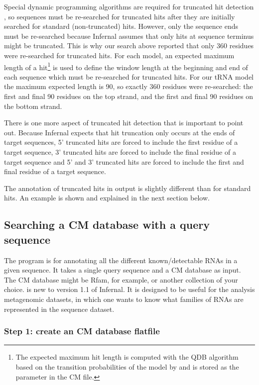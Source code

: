 Special dynamic programming algorithms are required for truncated hit
detection \cite{KolbeEddy09}, so sequences must be re-searched for
truncated hits after they are initially searched for standard
(non-truncated) hits. However, only the sequence ends must be
re-searched because Infernal assumes that only hits at sequence
terminus might be truncated. This is why our search above reported
that only 360 residues were re-searched for truncated hits. For each
model, an expected maximum length of a hit\footnote{The expected
maximum hit length is computed with the QDB algorithm
\cite{NawrockiEddy07} based on the transition probabilities of the
model by  and is stored as the  parameter in
the CM file.}  is used to define the window length at the beginning
and end of each sequence which must be re-searched for truncated
hits. For our tRNA model the maximum expected length is 90, so
exactly 360 residues were re-searched: the first and final 90 residues
on the top strand, and the first and final 90 residues on the bottom
strand. 

There is one more aspect of truncated hit detection that is important
to point out. Because Infernal expects that hit truncation only occurs
at the ends of target sequences, 5' truncated hits are forced to
include the first residue of a target sequence, 3' truncated hits are
forced to include the final residue of a target sequence and 5' and 3'
truncated hits are forced to include the first and final residue of a
target sequence. 

The annotation of truncated hits in  output is slightly
different than for standard hits. An example is shown and explained
in the next section below. 

\subsection{Searching a CM database with a query sequence}

The  program is for annotating all the different
known/detectable RNAs in a given sequence. It takes a single query
sequence and a CM database as input. The CM database might be Rfam,
for example, or another collection of your choice.  is
new to version 1.1 of Infernal. It is designed to be useful for
the analysis metagenomic datasets, in which one wants to know what
families of RNAs are represented in the sequence dataset.

\subsubsection{Step 1: create an CM database flatfile}

